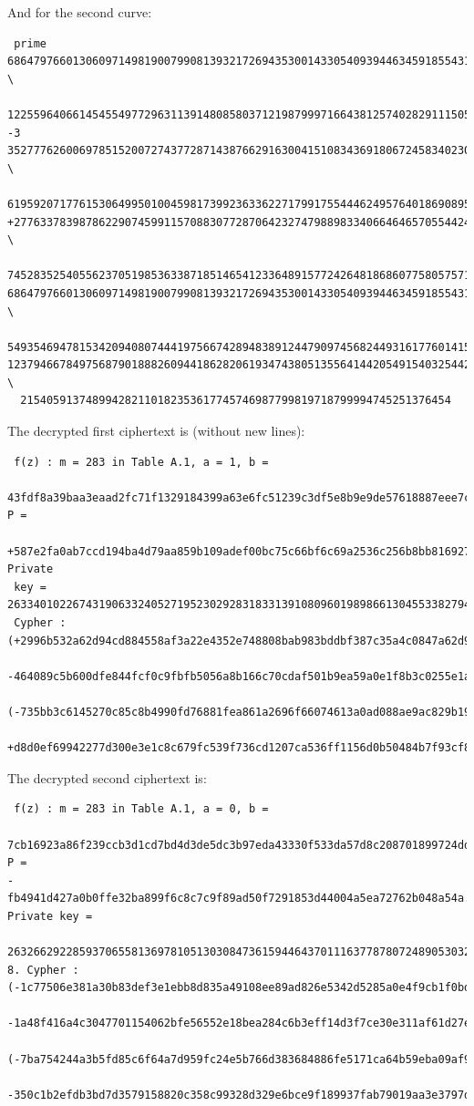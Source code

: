 \documentclass[11pt,english]{article}
\begin{document}
And for the second curve:

\begin{verbatim}
 prime
6864797660130609714981900799081393217269435300143305409394463459185543183397656052 \
  122559640661454554977296311391480858037121987999716643812574028291115057151
-3
3527776260069785152007274377287143876629163004151083436918067245834023095352803352 \
  619592071776153064995010045981739923633622717991755444624957640186908953364
+277633783987862290745991157088307728706423274798898334066464657055442467551243242 \
  7452835254055623705198536338718514654123364891577242648186860775805757142087
6864797660130609714981900799081393217269435300143305409394463459185543183397650992 \
  549354694781534209408074441975667428948389124479097456824493161776014158579
1237946678497568790188826094418628206193474380513556414420549154032544215130643918 \
  215405913748994282110182353617745746987799819718799994745251376454
\end{verbatim}

The decrypted first ciphertext is (without new lines):

\begin{verbatim}
 f(z) : m = 283 in Table A.1, a = 1, b =
 43fdf8a39baa3eaad2fc71f1329184399a63e6fc51239c3df5e8b9e9de57618887eee7c, P =
 +587e2fa0ab7ccd194ba4d79aa859b109adef00bc75c66bf6c69a2536c256b8bb816927b. Private
 key = 26334010226743190633240527195230292831833139108096019898661304553382794977231705.
 Cypher : (+2996b532a62d94cd884558af3a22e4352e748808bab983bddbf387c35a4c0847a62d92c,
 -464089c5b600dfe844fcf0c9fbfb5056a8b166c70cdaf501b9ea59a0e1f8b3c0255e1ac)
 (-735bb3c6145270c85c8b4990fd76881fea861a2696f66074613a0ad088ae9ac829b1976,
 +d8d0ef69942277d300e3e1c8c679fc539f736cd1207ca536ff1156d0b50484b7f93cf8).
\end{verbatim}

The decrypted second ciphertext is:

\begin{verbatim}
 f(z) : m = 283 in Table A.1, a = 0, b =
 7cb16923a86f239ccb3d1cd7bd4d3de5dc3b97eda43330f533da57d8c208701899724dd, P = 
-fb4941d427a0b0ffe32ba899f6c8c7c9f89ad50f7291853d44004a5ea72762b048a54a. Private key =
 26326629228593706558136978105130308473615944643701116377878072489053032875983292312
8. Cypher : (-1c77506e381a30b83def3e1ebb8d835a49108ee89ad826e5342d5285a0e4f9cb1f0bd28,
 -1a48f416a4c3047701154062bfe56552e18bea284c6b3eff14d3f7ce30e311af61d27ee)
 (-7ba754244a3b5fd85c6f64a7d959fc24e5b766d383684886fe5171ca64b59eba09af9fe,
 -350c1b2efdb3bd7d3579158820c358c99328d329e6bce9f189937fab79019aa3e3797d8).
\end{verbatim}
\end{document}
